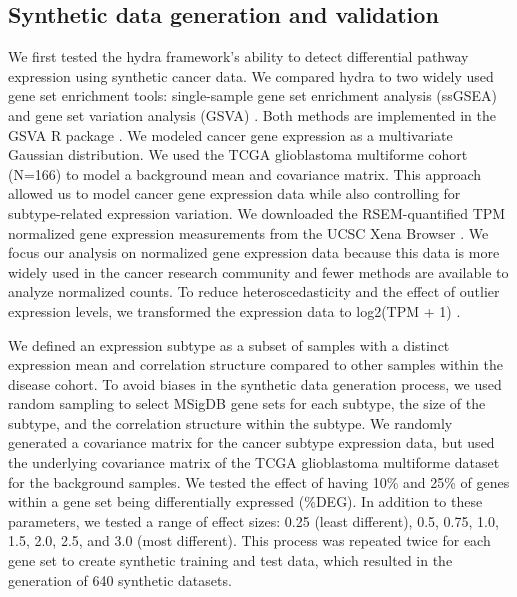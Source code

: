 \documentclass[10pt,letterpaper]{article}
\begin{document}
\subsection*{Synthetic data generation and validation}
We first tested the hydra framework’s ability to detect differential pathway expression using synthetic cancer data. We compared hydra to two widely used gene set enrichment tools: single-sample gene set enrichment analysis (ssGSEA) and gene set variation analysis (GSVA) \cite{barbieSystematicRNAInterference2009, hanzelmannGSVAGeneSet2013, tarcaComparisonGeneSet2013}. Both methods are implemented in the GSVA R package \cite{hanzelmannGSVAGeneSet2013}. We modeled cancer gene expression as a multivariate Gaussian distribution. We used the TCGA glioblastoma multiforme cohort (N=166) to model a background mean and covariance matrix. This approach allowed us to model cancer gene expression data while also controlling for subtype-related expression variation. We downloaded the RSEM-quantified TPM normalized gene expression measurements from the UCSC Xena Browser \cite{goldmanUCSCXenaPlatform2018}. We focus our analysis on normalized gene expression data because this data is more widely used in the cancer research community and fewer methods are available to analyze normalized counts. To reduce heteroscedasticity and the effect of outlier expression levels, we transformed the expression data to log2(TPM + 1) \cite{zwienerTransformingRNASeqData2014}. 

We defined an expression subtype as a subset of samples with a distinct expression mean and correlation structure compared to other samples within the disease cohort. To avoid biases in the synthetic data generation process, we used random sampling to select MSigDB gene sets for each subtype, the size of the subtype, and the correlation structure within the subtype. We randomly generated a covariance matrix for the cancer subtype expression data, but used the underlying covariance matrix of the TCGA glioblastoma multiforme dataset for the background samples. We tested the effect of having 10\% and 25\% of genes within a gene set being differentially expressed (\%DEG). In addition to these parameters, we tested a range of effect sizes: 0.25 (least different), 0.5, 0.75, 1.0, 1.5, 2.0, 2.5, and 3.0 (most different). This process was repeated twice for each gene set to create synthetic training and test data, which resulted in the generation of 640 synthetic datasets. 
\end{document}
